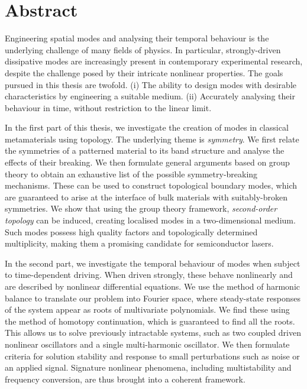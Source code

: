 
\chapter*{Abstract}

Engineering spatial modes and analysing their temporal behaviour is the underlying challenge of many fields of physics. In particular, strongly-driven dissipative modes are increasingly present in contemporary experimental research, despite the challenge posed by their intricate nonlinear properties. The goals pursued in this thesis are twofold. (i) The ability to design modes with desirable characteristics by engineering a suitable medium. (ii) Accurately analysing their behaviour in time, without restriction to the linear limit.

In the first part of this thesis, we investigate the creation of modes in classical metamaterials using topology. The underlying theme is \textit{symmetry}. We first relate the symmetries of a patterned material to its band structure and analyse the effects of their breaking. We then formulate general arguments based on group theory to obtain an exhaustive list of the possible symmetry-breaking mechanisms. These can be used to construct topological boundary modes, which are guaranteed to arise at the interface of bulk materials with suitably-broken symmetries. We show that using the group theory framework, \textit{second-order topology} can be induced, creating localised modes in a two-dimensional medium. Such modes possess high quality factors and topologically determined multiplicity, making them a promising candidate for semiconductor lasers.

In the second part, we investigate the temporal behaviour of modes when subject to time-dependent driving. When driven strongly, these behave nonlinearly and are described by nonlinear differential equations. We use the method of harmonic balance to translate our problem into Fourier space, where steady-state responses of the system appear as roots of multivariate polynomials. We find these using the method of homotopy continuation, which is guaranteed to find all the roots. This allows us to solve previously intractable systems, such as two coupled driven nonlinear oscillators and a single multi-harmonic oscillator. We then formulate criteria for solution stability and response to small perturbations such as noise or an applied signal. Signature nonlinear phenomena, including multistability and frequency conversion, are thus brought into a coherent framework.

